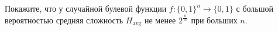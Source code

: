 Покажите, что у случайной булевой функции $f\colon \{0, 1\}^n \rightarrow \{0, 1\}$ с большой
вероятностью средняя сложность $H_{\mathrm{avg}}$ не менее $2^{\frac{n}{10}}$ при больших $n$.